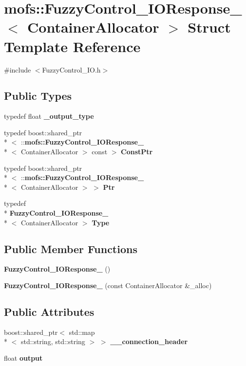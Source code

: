 \section{mofs\-:\-:Fuzzy\-Control\-\_\-\-I\-O\-Response\-\_\-$<$ Container\-Allocator $>$ Struct Template Reference}
\label{structmofs_1_1FuzzyControl__IOResponse__}


{\ttfamily \#include $<$Fuzzy\-Control\-\_\-\-I\-O.\-h$>$}

\subsection*{Public Types}
\begin{DoxyCompactItemize}
\item 
typedef float {\bf \-\_\-output\-\_\-type}
\item 
typedef boost\-::shared\-\_\-ptr\\*
$<$ \-::{\bf mofs\-::\-Fuzzy\-Control\-\_\-\-I\-O\-Response\-\_\-}\\*
$<$ Container\-Allocator $>$ const  $>$ {\bf Const\-Ptr}
\item 
typedef boost\-::shared\-\_\-ptr\\*
$<$ \-::{\bf mofs\-::\-Fuzzy\-Control\-\_\-\-I\-O\-Response\-\_\-}\\*
$<$ Container\-Allocator $>$ $>$ {\bf Ptr}
\item 
typedef \\*
{\bf Fuzzy\-Control\-\_\-\-I\-O\-Response\-\_\-}\\*
$<$ Container\-Allocator $>$ {\bf Type}
\end{DoxyCompactItemize}
\subsection*{Public Member Functions}
\begin{DoxyCompactItemize}
\item 
{\bf Fuzzy\-Control\-\_\-\-I\-O\-Response\-\_\-} ()
\item 
{\bf Fuzzy\-Control\-\_\-\-I\-O\-Response\-\_\-} (const Container\-Allocator \&\-\_\-alloc)
\end{DoxyCompactItemize}
\subsection*{Public Attributes}
\begin{DoxyCompactItemize}
\item 
boost\-::shared\-\_\-ptr$<$ std\-::map\\*
$<$ std\-::string, std\-::string $>$ $>$ {\bf \-\_\-\-\_\-connection\-\_\-header}
\item 
float {\bf output}
\end{DoxyCompactItemize}


